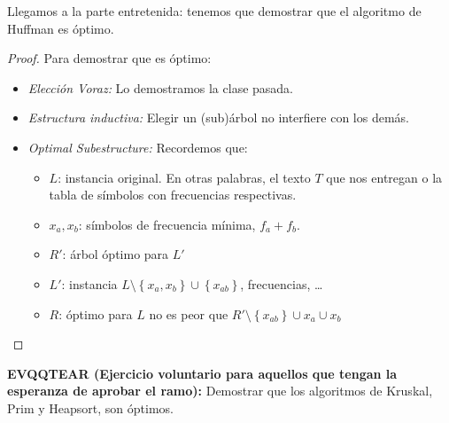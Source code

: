 \documentclass[english, spanish, fleqn, 10pt]{article}
\numberwithin{equation}{section}
\newcommand{\llaves}[1]{\left \{ #1 \right \}}
\theoremstyle{definition}
\begin{document}
Llegamos a la parte entretenida: tenemos que demostrar que el algoritmo de Huffman es óptimo.
\begin{proof}
	Para demostrar que es óptimo:
	\begin{itemize}
		\item \emph{Elección Voraz:} Lo demostramos la clase pasada.
		
		\item \emph{Estructura inductiva:} Elegir un (sub)árbol no interfiere con los demás.
		
		\item \emph{Optimal Subestructure:} Recordemos que:
		\begin{itemize}
			\item $L$: instancia original. En otras palabras, el texto $T$ que nos entregan o la tabla de símbolos con frecuencias respectivas.
			\item $x_a, x_b$: símbolos de frecuencia mínima, $f_a+f_b$.
			\item $R'$: árbol óptimo para $L'$
			\item $L'$: instancia $L\setminus \llaves{x_a, x_b}\cup \llaves{x_{ab}}$, frecuencias, \ldots
			\item $R$: óptimo para $L$ no es peor que $R'\setminus \llaves{x_{ab}}\cup x_a\cup x_b$
		\end{itemize}
	\end{itemize}
\end{proof}
\noindent\textbf{EVQQTEAR (Ejercicio voluntario para aquellos que tengan la esperanza de aprobar el ramo):} Demostrar que los algoritmos de Kruskal, Prim y Heapsort, son óptimos.
\end{document}
